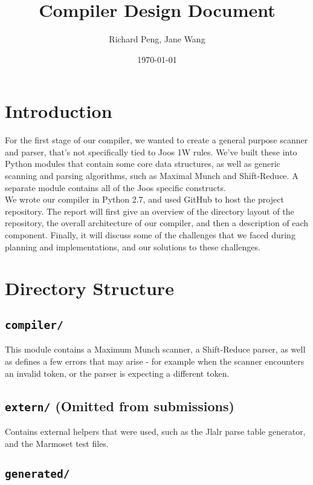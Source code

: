 \documentclass[12pt, a4paper]{article}
\title{Compiler Design Document}
\date{\today}
\author{Richard Peng, Jane Wang}
\begin{document}
\maketitle

\section{Introduction}

For the first stage of our compiler, we wanted to create a general purpose scanner and parser, that's not specifically tied to Joos 1W rules. We've built these into Python modules that contain some core data structures, as well as generic scanning and parsing algorithms, such as Maximal Munch and Shift-Reduce. A separate module contains all of the Joos specific constructs. \\

We wrote our compiler in Python 2.7, and used GitHub to host the project repository. The report will first give an overview of the directory layout of the repository, the overall architecture of our compiler, and then a description of each component. Finally, it will discuss some of the challenges that we faced during planning and implementations, and our solutions to these challenges.

\section{Directory Structure}

\subsection{\texttt{compiler/}}

This module contains a Maximum Munch scanner, a Shift-Reduce parser, as well as defines a few errors that may arise - for example when the scanner encounters an invalid token, or the parser is expecting a different token.

\subsection{\texttt{extern/} (Omitted from submissions)}

Contains external helpers that were used, such as the Jlalr parse table generator, and the Marmoset test files.
 
\subsection{\texttt{generated/}}
\end{document}
